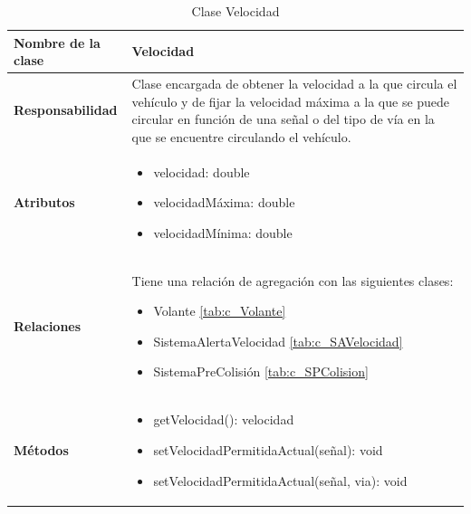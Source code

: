 \begin{table}[h]
\begin{center}
\begin{tabular}{p{} p{11cm}}
\textbf{Nombre de la clase} &  Velocidad\\ \hline \hline
\textbf{Responsabilidad} &  Clase encargada de obtener la velocidad a la que circula el vehículo y de fijar la velocidad máxima a la que se puede circular en función de una señal o del tipo de vía en la que se encuentre circulando el vehículo.  \\ \hline
\textbf{Atributos} & \begin{itemize}
                      \item velocidad: double
                      \item velocidadMáxima: double
                      \item velocidadMínima: double

                    \end{itemize}\\ \hline
\textbf{Relaciones} &

                      \par Tiene una relación de agregación con las siguientes clases:
                      \begin{itemize}
                        \item Volante \ref{tab:c_Volante}
                        \item SistemaAlertaVelocidad \ref{tab:c_SAVelocidad}
                        \item SistemaPreColisión \ref{tab:c_SPColision}
                      \end{itemize}



                      \\ \hline

\textbf{Métodos} &  \begin{itemize}
                      \item getVelocidad(): velocidad
                      \item setVelocidadPermitidaActual(señal): void
                      \item setVelocidadPermitidaActual(señal, via): void
                    \end{itemize}\\ \hline
\end{tabular}
\caption{Clase Velocidad}
\label{tab:c_velocidad}
\end{center}
\end{table}












